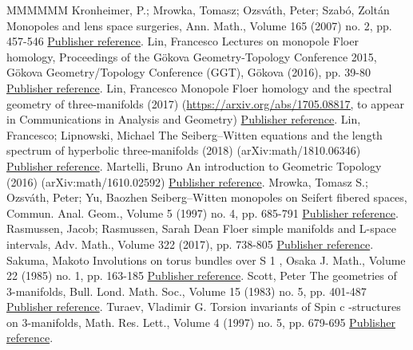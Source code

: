 \begin{thebibliography}{MMMMMM}
 Kronheimer, P.; Mrowka, Tomasz; Ozsváth, Peter; Szabó, Zoltán Monopoles and lens space surgeries, Ann. Math., Volume 165 (2007) no. 2, pp. 457-546 \href{https://ahl.centre-mersenne.org/item/AHL_2020__3__1117_0/#KMOS}{Publisher reference}.
 Lin, Francesco Lectures on monopole Floer homology, Proceedings of the Gökova Geometry-Topology Conference 2015, Gökova Geometry/Topology Conference (GGT), Gökova (2016), pp. 39-80 \href{https://ahl.centre-mersenne.org/item/AHL_2020__3__1117_0/#Lin3}{Publisher reference}.
 Lin, Francesco Monopole Floer homology and the spectral geometry of three-manifolds (2017) (\url{https://arxiv.org/abs/1705.08817,} to appear in Communications in Analysis and Geometry) \href{https://ahl.centre-mersenne.org/item/AHL_2020__3__1117_0/#Lin4}{Publisher reference}.
 Lin, Francesco; Lipnowski, Michael The Seiberg–Witten equations and the length spectrum of hyperbolic three-manifolds (2018) (arXiv:math/1810.06346) \href{https://ahl.centre-mersenne.org/item/AHL_2020__3__1117_0/#LL}{Publisher reference}.
 Martelli, Bruno An introduction to Geometric Topology (2016) (arXiv:math/1610.02592) \href{https://ahl.centre-mersenne.org/item/AHL_2020__3__1117_0/#Mar}{Publisher reference}.
 Mrowka, Tomasz S.; Ozsváth, Peter; Yu, Baozhen Seiberg–Witten monopoles on Seifert fibered spaces, Commun. Anal. Geom., Volume 5 (1997) no. 4, pp. 685-791 \href{https://ahl.centre-mersenne.org/item/AHL_2020__3__1117_0/#MOY}{Publisher reference}.
 Rasmussen, Jacob; Rasmussen, Sarah Dean Floer simple manifolds and L-space intervals, Adv. Math., Volume 322 (2017), pp. 738-805 \href{https://ahl.centre-mersenne.org/item/AHL_2020__3__1117_0/#RR}{Publisher reference}.
 Sakuma, Makoto Involutions on torus bundles over S 1 , Osaka J. Math., Volume 22 (1985) no. 1, pp. 163-185 \href{https://ahl.centre-mersenne.org/item/AHL_2020__3__1117_0/#Sak}{Publisher reference}.
 Scott, Peter The geometries of 3-manifolds, Bull. Lond. Math. Soc., Volume 15 (1983) no. 5, pp. 401-487 \href{https://ahl.centre-mersenne.org/item/AHL_2020__3__1117_0/#Sco}{Publisher reference}.
 Turaev, Vladimir G. Torsion invariants of  Spin  c -structures on 3-manifolds, Math. Res. Lett., Volume 4 (1997) no. 5, pp. 679-695 \href{https://ahl.centre-mersenne.org/item/AHL_2020__3__1117_0/#Tur}{Publisher reference}.
\end{thebibliography}
